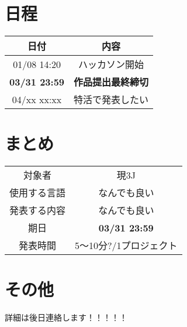 \documentclass[a4j]{jarticle}
\begin{document}
\section{日程}

\begin{table}[H]
    \center
    \begin{tabular}{c|c} \hline
        日付 & 内容 \\ \hline
        01/08 14:20 & ハッカソン開始 \\
        \textbf{03/31 23:59} & \textbf{作品提出最終締切}\footnotemark \\
        04/xx xx:xx & 特活で発表したい\footnotemark \\ \hline
    \end{tabular}
\end{table}

\section{まとめ}
\begin{table}[H]
    \center
    \begin{tabular}{c|c} \hline
        対象者 & 現3J \\
        使用する言語 & なんでも良い \\
        発表する内容 & なんでも良い \\
        期日 & \textbf{03/31 23:59}  \\
        発表時間 & 5〜10分?/1プロジェクト  \\ \hline
    \end{tabular}
\end{table}

\section{その他}
詳細は後日連絡します！！！！！

\end{document}
